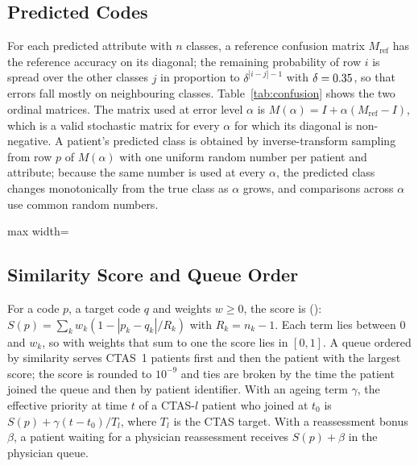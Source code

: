 \subsection{Predicted Codes}

For each predicted attribute with $n$ classes, a reference confusion matrix $M_{\text{ref}}$ has the reference accuracy on its diagonal; the remaining probability of row $i$ is spread over the other classes $j$ in proportion to $\delta^{|i-j|-1}$ with $\delta=0.35$, so that errors fall mostly on neighbouring classes. Table~\ref{tab:confusion} shows the two ordinal matrices. The matrix used at error level $\alpha$ is $M(\alpha)=I+\alpha(M_{\text{ref}}-I)$, which is a valid stochastic matrix for every $\alpha$ for which its diagonal is non-negative. A patient's predicted class is obtained by inverse-transform sampling from row $p$ of $M(\alpha)$ with one uniform random number per patient and attribute; because the same number is used at every $\alpha$, the predicted class changes monotonically from the true class as $\alpha$ grows, and comparisons across $\alpha$ use common random numbers.

\begin{table}[!htbp]
\centering
\caption{Reference confusion matrices ($\alpha=1$) for the two ordinal predicted attributes. Rows: true class; columns: predicted class.}
\label{tab:confusion}
\footnotesize
\begin{adjustbox}{max width=\linewidth}\end{adjustbox}
\end{table}

\subsection{Similarity Score and Queue Order}

For a code $p$, a target code $q$ and weights $w\geq 0$, the score is (): $S(p)=\sum_k w_k(1-|p_k-q_k|/R_k)$ with $R_k=n_k-1$. Each term lies between $0$ and $w_k$, so with weights that sum to one the score lies in $[0,1]$. A queue ordered by similarity serves CTAS~1 patients first and then the patient with the largest score; the score is rounded to $10^{-9}$ and ties are broken by the time the patient joined the queue and then by patient identifier. With an ageing term $\gamma$, the effective priority at time $t$ of a CTAS-$l$ patient who joined at $t_0$ is $S(p)+\gamma(t-t_0)/T_l$, where $T_l$ is the CTAS target. With a reassessment bonus $\beta$, a patient waiting for a physician reassessment receives $S(p)+\beta$ in the physician queue.

